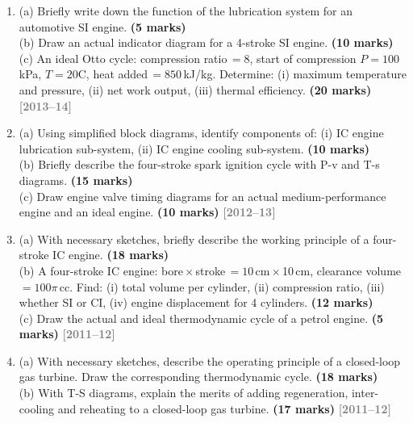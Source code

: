 \documentclass[12pt,a3paper]{article}
\newcommand{\yr}[1]{\hfill\textcolor{gray}{\small\textbf{[#1]}}}
\newcommand{\mk}[1]{\textcolor{orange!70!black}{\small\textbf{(#1 marks)}}}
\begin{document}
\begin{enumerate}
\item \label{qlabel:A2-Q20}
(a) Briefly write down the function of the lubrication system for an automotive SI engine. \mk{5}\\
(b) Draw an actual indicator diagram for a 4-stroke SI engine. \mk{10}\\
(c) An ideal Otto cycle: compression ratio\,$= 8$, start of compression $P = 100$\,kPa, $T = 20$\textdegree C, heat added\,$= 850$\,kJ/kg. Determine: (i) maximum temperature and pressure, (ii) net work output, (iii) thermal efficiency. \mk{20}
\yr{2013--14}




\item \label{qlabel:A2-Q19}
(a) Using simplified block diagrams, identify components of: (i) IC engine lubrication sub-system, (ii) IC engine cooling sub-system. \mk{10}\\
(b) Briefly describe the four-stroke spark ignition cycle with P-v and T-s diagrams. \mk{15}\\
(c) Draw engine valve timing diagrams for an actual medium-performance engine and an ideal engine. \mk{10}
\yr{2012--13}



\item \label{qlabel:A2-Q17}
(a) With necessary sketches, briefly describe the working principle of a four-stroke IC engine. \mk{18}\\
(b) A four-stroke IC engine: bore\,$\times$\,stroke\,$= 10$\,cm\,$\times$\,10\,cm, clearance volume\,$= 100\pi$\,cc. Find: (i) total volume per cylinder, (ii) compression ratio, (iii) whether SI or CI, (iv) engine displacement for 4 cylinders. \mk{12}\\
(c) Draw the actual and ideal thermodynamic cycle of a petrol engine. \mk{5}
\yr{2011--12}




\item \label{qlabel:A2-Q18}
(a) With necessary sketches, describe the operating principle of a closed-loop gas turbine. Draw the corresponding thermodynamic cycle. \mk{18}\\
(b) With T-S diagrams, explain the merits of adding regeneration, inter-cooling and reheating to a closed-loop gas turbine. \mk{17}
\yr{2011--12}





\end{enumerate}
\end{document}
